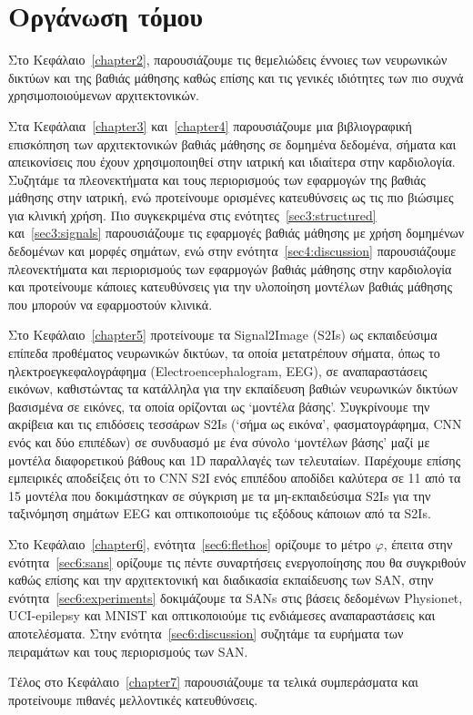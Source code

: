 \section{Οργάνωση τόμου}
Στο Κεφάλαιο~\ref{chapter2}, παρουσιάζουμε τις θεμελιώδεις έννοιες των νευρωνικών δικτύων και της βαθιάς μάθησης καθώς επίσης και τις γενικές ιδιότητες των πιο συχνά χρησιμοποιούμενων αρχιτεκτονικών.

Στα Κεφάλαια~\ref{chapter3} και~\ref{chapter4} παρουσιάζουμε μια βιβλιογραφική επισκόπηση των αρχιτεκτονικών βαθιάς μάθησης σε δομημένα δεδομένα, σήματα και απεικονίσεις που έχουν χρησιμοποιηθεί στην ιατρική και ιδιαίτερα στην καρδιολογία.
Συζητάμε τα πλεονεκτήματα και τους περιορισμούς των εφαρμογών της βαθιάς μάθησης στην ιατρική, ενώ προτείνουμε ορισμένες κατευθύνσεις ως τις πιο βιώσιμες για κλινική χρήση.
Πιο συγκεκριμένα στις ενότητες~\ref{sec3:structured} και~\ref{sec3:signals} παρουσιάζουμε τις εφαρμογές βαθιάς μάθησης με χρήση δομημένων δεδομένων και μορφές σημάτων, ενώ στην ενότητα~\ref{sec4:discussion} παρουσιάζουμε πλεονεκτήματα και περιορισμούς των εφαρμογών βαθιάς μάθησης στην καρδιολογία και προτείνουμε κάποιες κατευθύνσεις για την υλοποίηση μοντέλων βαθιάς μάθησης που μπορούν να εφαρμοστούν κλινικά.

Στο Κεφάλαιο~\ref{chapter5} προτείνουμε τα Signal2Image (S2Is) ως εκπαιδεύσιμα επίπεδα προθέματος νευρωνικών δικτύων, τα οποία μετατρέπουν σήματα, όπως το ηλεκτροεγκεφαλογράφημα (Electroencephalogram, EEG), σε αναπαραστάσεις εικόνων, καθιστώντας τα κατάλληλα για την εκπαίδευση βαθιών νευρωνικών δικτύων βασισμένα σε εικόνες, τα οποία ορίζονται ως `μοντέλα βάσης'.
Συγκρίνουμε την ακρίβεια και τις επιδόσεις τεσσάρων S2Is (`σήμα ως εικόνα', φασματογράφημα, CNN ενός και δύο επιπέδων) σε συνδυασμό με ένα σύνολο `μοντέλων βάσης' μαζί με μοντέλα διαφορετικού βάθους και 1D παραλλαγές των τελευταίων.
Παρέχουμε επίσης εμπειρικές αποδείξεις ότι το CNN S2I ενός επιπέδου αποδίδει καλύτερα σε 11 από τα 15 μοντέλα που δοκιμάστηκαν σε σύγκριση με τα μη-εκπαιδεύσιμα S2Is για την ταξινόμηση σημάτων EEG και οπτικοποιούμε τις εξόδους κάποιων από τα S2Is.

Στο Κεφάλαιο~\ref{chapter6}, ενότητα~\ref{sec6:flethos} ορίζουμε το μέτρο $\varphi$, έπειτα στην ενότητα~\ref{sec6:sans} ορίζουμε τις πέντε συναρτήσεις ενεργοποίησης που θα συγκριθούν καθώς επίσης και την αρχιτεκτονική και διαδικασία εκπαίδευσης των SAN, στην ενότητα~\ref{sec6:experiments} δοκιμάζουμε τα SANs στις βάσεις δεδομένων Physionet, UCI-epilepsy και MNIST και οπτικοποιούμε τις ενδιάμεσες αναπαραστάσεις και αποτελέσματα.
Στην ενότητα~\ref{sec6:discussion} συζητάμε τα ευρήματα των πειραμάτων και τους περιορισμούς των SAN\@.

Τέλος στο Κεφάλαιο~\ref{chapter7} παρουσιάζουμε τα τελικά συμπεράσματα και προτείνουμε πιθανές μελλοντικές κατευθύνσεις.
